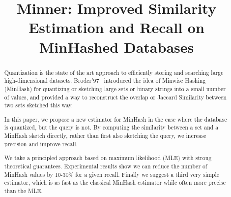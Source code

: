 
\title{Minner: Improved Similarity Estimation and Recall on MinHashed Databases}

\begin{abstract}
   Quantization is the state of the art approach to efficiently storing and searching large high-dimensional datasets.
   Broder'97~\cite{broder1997resemblance} introduced the idea of Minwise Hashing (MinHash) for quantizing or sketching large sets or binary strings into a small number of values, and provided a way to reconstruct the overlap or Jaccard Similarity between two sets sketched this way.

   In this paper, we propose a new estimator for MinHash in the case where the database is quantized, but the query is not.
   By computing the similarity between a set and a MinHash sketch directly, rather than first also sketching the query, we increase precision and improve recall.

   We take a principled approach based on maximum likelihood (MLE) with strong theoretical guarantees.
   Experimental results show
   we can reduce the number of MinHash values by 10-30\% for a given recall.%
   Finally we suggest a third very simple estimator, which is as fast as the classical MinHash estimator while often more precise than the MLE.








\end{abstract}
